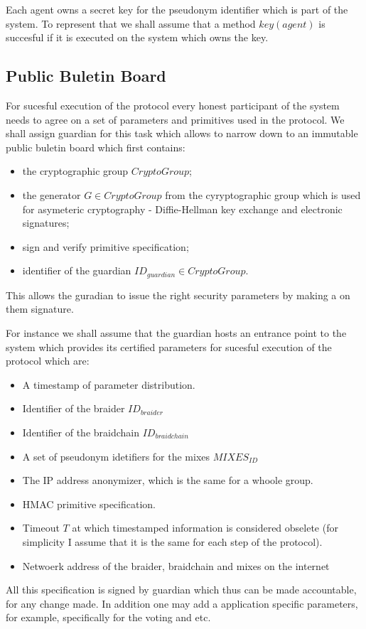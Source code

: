 \documentclass[12pt]{article}
\begin{document}
Each agent owns a secret key for the pseudonym identifier which is part of the system. To represent that we shall assume that a method $key(agent)$ is succesful if it is executed on the system which owns the key. 

\subsection*{Public Buletin Board}

For sucesful execution of the protocol every honest participant of the system needs to agree on a set of parameters and primitives used in the protocol. We shall assign guardian for this task which allows to narrow down to an immutable public buletin board which first contains:
\begin{itemize}
\item the cryptographic group $CryptoGroup$;
\item the generator $G \in CryptoGroup$ from the cyryptographic group which is used for asymeteric cryptography - Diffie-Hellman key exchange and electronic signatures;
\item sign and verify primitive specification;
\item identifier of the guardian $ID_{guardian} \in CryptoGroup$.
\end{itemize}
This allows the guradian to issue the right security parameters by making a on them signature. 

For instance we shall assume that the guardian hosts an entrance point to the system which provides its certified parameters for sucesful execution of the protocol which are:
\begin{itemize}
\item A timestamp of parameter distribution.
\item Identifier of the braider $ID_{braider}$
\item Identifier of the braidchain $ID_{braidchain}$
\item A set of pseudonym idetifiers for the mixes $MIXES_{ID}$
\item The IP address anonymizer, which is the same for a whoole group.
\item HMAC primitive specification. 
\item Timeout $T$ at which timestamped information is considered obselete (for simplicity I assume that it is the same for each step of the protocol).
\item Netwoerk address of the braider, braidchain and mixes on the internet
\end{itemize}
All this specification is signed by guardian which thus can be made accountable, for any change made. In addition one may add a application specific parameters, for example, specifically for the voting and etc.
\end{document}
